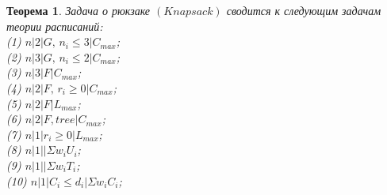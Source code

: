 \documentclass[a4paper,12pt]{article}
\theoremstyle{plain} %
\newtheorem{theorem}{Теорема}[section]
\theoremstyle{definition} %
\theoremstyle{remark} %
\begin{document}
\begin{theorem}
	Задача о рюкзаке $(Knapsack)$ сводится к следующим задачам теории расписаний:\\
	(1) $n|2|G, \, n_i \le 3|C_{max}$;\\
	(2) $n|3|G, \, n_i \le 2|C_{max}$;\\
	(3) $n|3|F|C_{max}$;\\
	(4) $n|2|F, \, r_i \ge 0|C_{max}$;\\
	(5) $n|2|F|L_{max}$;\\
	(6) $n|2|F, tree|C_{max}$;\\
	(7) $n|1|r_i \ge 0|L_{max}$;\\
	(8) $n|1||\Sigma w_i U_i$;\\
	(9) $n|1||\Sigma w_i T_i$;\\
	(10) $n|1|C_i \le d_i|\Sigma w_i C_i$;\\
\end{theorem}
\end{document}
